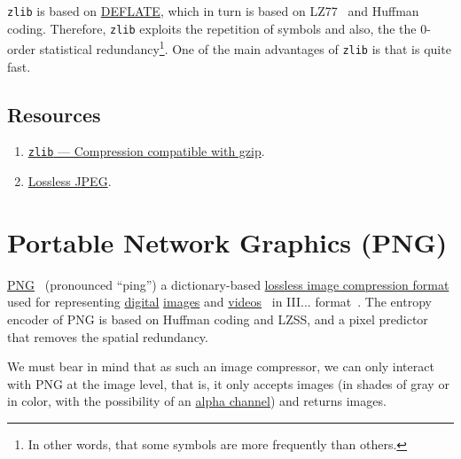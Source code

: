 \texttt{zlib} is based on
\href{https://en.wikipedia.org/wiki/Deflate}{DEFLATE}, which in turn
is based on LZ77~\cite{vruiz__LZW,ruiz2000compresion} and Huffman
coding. Therefore, \texttt{zlib} exploits the repetition of symbols
and also, the the 0-order statistical redundancy\footnote{In other
words, that some symbols are more frequently than others.}. One of the
main advantages of \texttt{zlib} is that is quite fast.

\subsection*{Resources}
\begin{enumerate}
\item \href{https://docs.python.org/3/library/zlib.html}{\texttt{zlib}
    — Compression compatible with gzip}.
\item \href{https://en.wikipedia.org/wiki/Lossless_JPEG}{Lossless JPEG}.
\end{enumerate}

\section{Portable Network Graphics (PNG)}

\href{https://en.wikipedia.org/wiki/Portable_Network_Graphics}{PNG}~\cite{vruiz__PNG}
(pronounced ``ping'') a dictionary-based
\href{https://en.wikipedia.org/wiki/Lossless_compression}{lossless
  image compression format} used for representing
\href{https://en.wikipedia.org/wiki/Digital_data}{digital}
\href{https://en.wikipedia.org/wiki/Digital_image}{images} and
\href{https://en.wikipedia.org/wiki/Video}{videos}~\cite{vruiz__image_video}
in III... format~\cite{vruiz__video_compression}. The entropy encoder
of PNG is based on Huffman coding and LZSS, and a pixel predictor that
removes the spatial redundancy.

We must bear in mind that as such an image compressor, we can only
interact with PNG at the image level, that is, it only accepts images
(in shades of gray or in color, with the possibility of an
\href{https://en.wikipedia.org/wiki/Alpha_compositing}{alpha channel})
and returns images.



